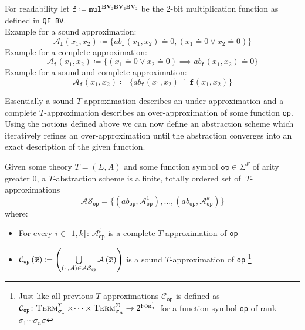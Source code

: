 \begin{example}
For readability let $\texttt{f} \coloneqq \texttt{mul}^{\mathbf{BV}_2\mathbf{BV}_2\mathbf{BV}_2}$ be the 2-bit multiplication function as defined in \texttt{QF\_BV}.\\
Example for a sound approximation:
\[
    \mathcal{A}_\texttt{f}\left(x_1,x_2\right) 
    \coloneqq \{
    ab_\texttt{f}\left(x_1,x_2\right) \doteq 0, \left(x_1\doteq 0 \lor x_2 \doteq 0\right)
    \}
\]
Example for a complete approximation:
\[
    \mathcal{A}_\texttt{f}\left(x_1,x_2\right) 
    \coloneqq \{
    \left(x_1\doteq 0 \lor x_2 \doteq 0\right) \implies ab_\texttt{f}\left(x_1,x_2\right) \doteq 0
    \}
\]
Example for a sound and complete approximation:
\[
\mathcal{A}_\texttt{f}\left(x_1,x_2\right) 
        \coloneqq \{
        ab_\texttt{f}\left(x_1,x_2\right) \doteq \texttt{f}\left(x_1,x_2\right)
        \}
\]
\end{example}
Essentially a sound $T$-approximation describes an under-approximation and a complete $T$-approximation describes an over-approximation of some function \texttt{op}. Using the notions defined above we can now define an abstraction scheme which iteratively refines an over-approximation until the abstraction converges into an exact description of the given function.
\begin{definition}
Given some theory $T=\left(\Sigma,A\right)$ and some function symbol $\texttt{op}\in\Sigma^F$ of arity greater $0$, a $T$-abstraction scheme is a finite, totally ordered set of $\ T$-approximations \[
\mathcal{AS}_{\texttt{op}} = \{ \left(ab_{\texttt{op}}, \mathcal{A}^1_{\texttt{op}}\right),\dots,\left(ab_{\texttt{op}}, \mathcal{A}^k_{\texttt{op}}\right) \}
\]
where:
\begin{itemize}
    \item For every $i\in\llbracket1,k\rrbracket$: $\mathcal{A}^i_{\texttt{op}}$ is a complete $T$-approximation of \texttt{op}
    \item $\mathcal{C}_{\texttt{op}}\left(\overline{x}\right)\coloneqq\left(\bigcup\limits_{\left({\mkern 2mu\cdot\mkern 2mu},\mathcal{A}\right)\in\mathcal{AS}_{\texttt{op}}} \mathcal{A}\left(\overline{x}\right)\right)$ is a sound $T$-approximation of \texttt{op}
    \footnote{
        Just like all previous $T$-approximations $\mathcal{C}_{\texttt{op}}$ is defined as
        $\mathcal{C}_{\texttt{op}}\colon \textsc{Term}^\Sigma_{\sigma_1}\times\dotsi\times\textsc{Term}^\Sigma_{\sigma_n} \to 2^{\textsc{For}^1_T}$ for a function symbol \texttt{op} of rank $\sigma_1\dotsi\sigma_n\sigma$
    }
\end{itemize}
\end{definition}

